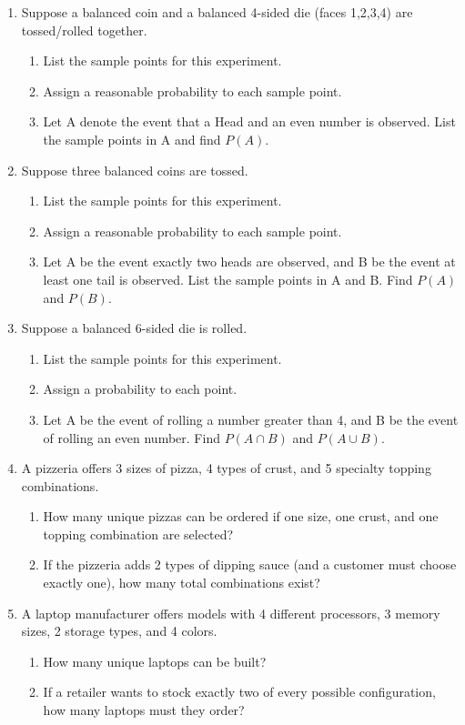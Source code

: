 \documentclass[11pt]{article}
\begin{document}
\begin{enumerate}
\item Suppose a balanced coin and a balanced 4-sided die (faces 1,2,3,4) are tossed/rolled together.
\begin{enumerate}
    \item List the sample points for this experiment.
    \item Assign a reasonable probability to each sample point.
    \item Let A denote the event that a Head and an even number is observed. List the sample points in A and find $P(A)$.
\end{enumerate}

\item Suppose three balanced coins are tossed.
\begin{enumerate}
    \item List the sample points for this experiment.
    \item Assign a reasonable probability to each sample point.
    \item Let A be the event exactly two heads are observed, and B be the event at least one tail is observed. List the sample points in A and B. Find $P(A)$ and $P(B)$.
\end{enumerate}

\item Suppose a balanced 6-sided die is rolled. 
\begin{enumerate}
    \item List the sample points for this experiment.
    \item Assign a probability to each point.
    \item Let A be the event of rolling a number greater than 4, and B be the event of rolling an even number. Find $P(A \cap B)$ and $P(A \cup B)$.
\end{enumerate}

\item A pizzeria offers 3 sizes of pizza, 4 types of crust, and 5 specialty topping combinations.
\begin{enumerate}
    \item How many unique pizzas can be ordered if one size, one crust, and one topping combination are selected?
    \item If the pizzeria adds 2 types of dipping sauce (and a customer must choose exactly one), how many total combinations exist?
\end{enumerate}

\item A laptop manufacturer offers models with 4 different processors, 3 memory sizes, 2 storage types, and 4 colors.
\begin{enumerate}
    \item How many unique laptops can be built?
    \item If a retailer wants to stock exactly two of every possible configuration, how many laptops must they order?
\end{enumerate}


\end{enumerate}
\end{document}
